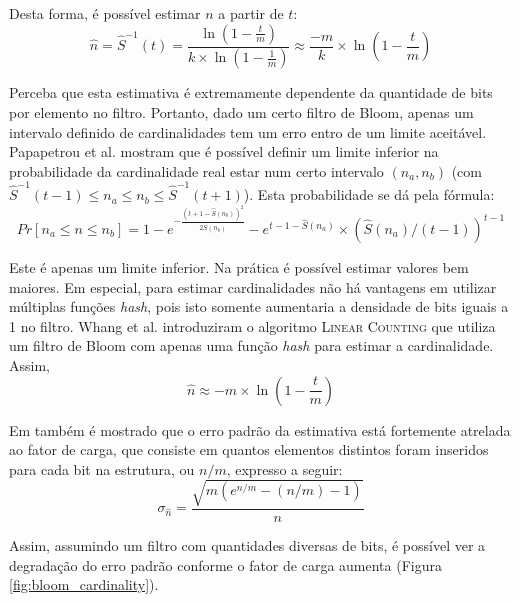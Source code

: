 Desta forma, é possível estimar $n$ a partir de $t$:
\[
\hat{n} = \hat{S}^{-1}(t) = \frac{\ln \left( 1 - \frac{t}{m} \right)}{k \times \ln \left( 1 - \frac{1}{m} \right)} \approx \frac{-m}{k} \times \ln \left( 1-\frac{t}{m} \right)
\]

Perceba que esta estimativa é extremamente dependente da quantidade de bits por elemento no filtro. Portanto, dado um certo filtro de Bloom, apenas um intervalo definido de cardinalidades tem um erro entro de um limite aceitável. Papapetrou et al. \cite{papapetrou2010cardinality} mostram que é possível definir um limite inferior na probabilidade da cardinalidade real estar num certo intervalo $(n_a, n_b)$ (com $\hat{S}^{-1}(t-1) \leq n_a \leq n_b \leq \hat{S}^{-1}(t+1)$). Esta probabilidade se dá pela fórmula:
\[
Pr[n_a \leq n \leq n_b] = 1 - e^{-\frac{(t+1-\hat{S}(n_b))^2}{2\hat{S}(n_b)}} - e^{t-1-\hat{S}(n_a)} \times \left( \hat{S}(n_a) / (t-1) \right)^{t-1}
\]

Este é apenas um limite inferior. Na prática é possível estimar valores bem maiores. Em especial, para estimar cardinalidades não há vantagens em utilizar múltiplas funções \emph{hash}, pois isto somente aumentaria a densidade de bits iguais a 1 no filtro. Whang et al. introduziram o algoritmo \textsc{Linear Counting} \cite{whang1990linear} que utiliza um filtro de Bloom com apenas uma função \emph{hash} para estimar a cardinalidade. Assim,
\[
\hat{n} \approx -m \times \ln \left( 1-\frac{t}{m} \right)
\]

Em  \cite{whang1990linear} também é mostrado que o erro padrão da estimativa está fortemente atrelada ao fator de carga, que consiste em quantos elementos distintos foram inseridos para cada bit na estrutura, ou $n/m$, expresso a seguir:
\[
\sigma_{\hat{n}} = \frac{\sqrt{m(e^{n/m} - (n/m) - 1)}}{n}
\]

Assim, assumindo um filtro com quantidades diversas de bits, é possível ver a degradação do erro padrão conforme o fator de carga aumenta (Figura \ref{fig:bloom_cardinality}).


